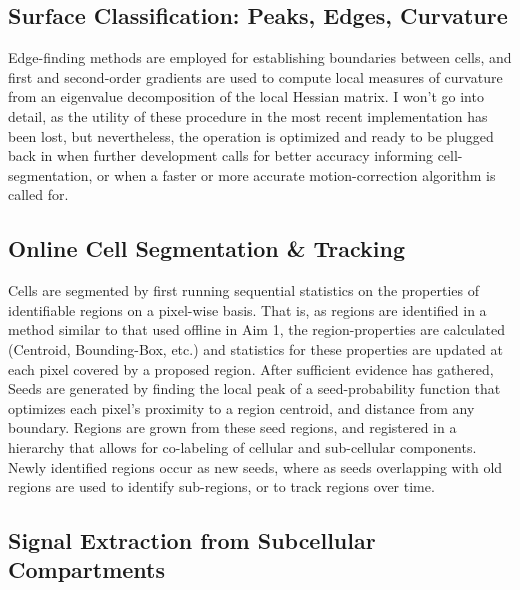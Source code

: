 \documentclass[
  12pt,
]{report}
\numberwithin{figure}{section}
\numberwithin{table}{section}
\numberwithin{equations}{section}
\begin{document}
\hypertarget{surface-classification-peaks-edges-curvature}{%
\subsection{Surface Classification: Peaks, Edges,
Curvature}\label{surface-classification-peaks-edges-curvature}}

Edge-finding methods are employed for establishing boundaries between
cells, and first and second-order gradients are used to compute local
measures of curvature from an eigenvalue decomposition of the local
Hessian matrix. I won't go into detail, as the utility of these
procedure in the most recent implementation has been lost, but
nevertheless, the operation is optimized and ready to be plugged back in
when further development calls for better accuracy informing
cell-segmentation, or when a faster or more accurate motion-correction
algorithm is called for.

\hypertarget{online-cell-segmentation-tracking}{%
\subsection{Online Cell Segmentation \&
Tracking}\label{online-cell-segmentation-tracking}}

Cells are segmented by first running sequential statistics on the
properties of identifiable regions on a pixel-wise basis. That is, as
regions are identified in a method similar to that used offline in Aim
1, the region-properties are calculated (Centroid, Bounding-Box, etc.)
and statistics for these properties are updated at each pixel covered by
a proposed region. After sufficient evidence has gathered, Seeds are
generated by finding the local peak of a seed-probability function that
optimizes each pixel's proximity to a region centroid, and distance from
any boundary. Regions are grown from these seed regions, and registered
in a hierarchy that allows for co-labeling of cellular and sub-cellular
components. Newly identified regions occur as new seeds, where as seeds
overlapping with old regions are used to identify sub-regions, or to
track regions over time.

\hypertarget{signal-extraction-from-subcellular-compartments}{%
\subsection{Signal Extraction from Subcellular
Compartments}\label{signal-extraction-from-subcellular-compartments}}
\end{document}
